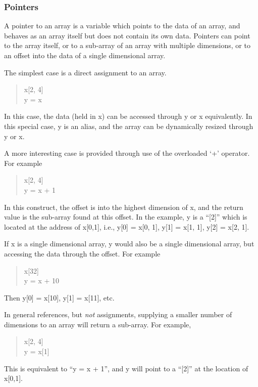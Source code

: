 \subsubsection{Pointers}

A pointer to an array is a variable which points to the data of an
array, and behaves as an array itself but does not contain its own
data.  Pointers can point to the array itself, or to a sub-array of an
array with multiple dimensions, or to an offset into the data of a
single dimensional array. 
 
The simplest case is a direct assignment to an array.
\begin{quote}\vt
x[2, 4]\\
y = x
\end{quote}

In this case, the data (held in {\vt x}) can be accessed through {\vt
y} or {\vt x} equivalently.  In this special case, {\vt y} is an
alias, and the array can be dynamically resized through {\vt y} or
{\vt x}.

A more interesting case is provided through use of the overloaded
`{\vt +}' operator.  For example
\begin{quote}\vt
x[2, 4]\\
y = x + 1
\end{quote}

In this construct, the offset is into the highest dimension of {\vt
x}, and the return value is the sub-array found at this offset.  In
the example, {\vt y} is a ``[2]'' which is located at the address of
{\vt x[0,1]}, i.e., {\vt y[0] = x[0, 1]}, {\vt y[1] = x[1, 1]}, {\vt
y[2] = x[2, 1]}.

If {\vt x} is a single dimensional array, {\vt y} would also be a
single dimensional array, but accessing the data through the offset. 
For example
\begin{quote}\vt
x[32]\\
y = x + 10
\end{quote}

Then {\vt y[0] = x[10]}, {\vt y[1] = x[11]}, etc.

In general references, but {\it not} assignments, supplying a smaller
number of dimensions to an array will return a sub-array.  For
example,
\begin{quote}\vt
x[2, 4]\\
y = x[1]
\end{quote}

This is equivalent to ``{\vt y = x + 1}'', and {\vt y} will point to a
``[2]'' at the location of {\vt x[0,1]}.

